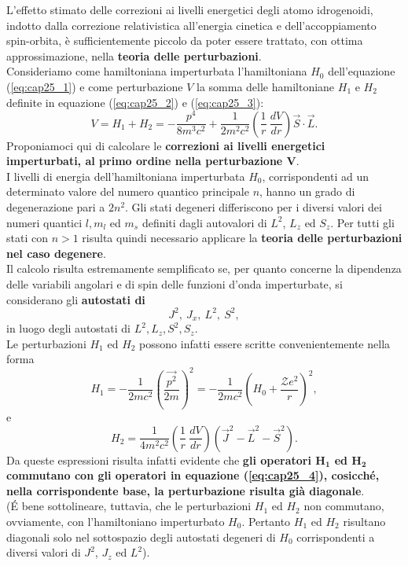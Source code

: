 L'effetto stimato delle correzioni ai livelli energetici degli atomo idrogenoidi, indotto dalla correzione relativistica all'energia cinetica e dell'accoppiamento spin-orbita, è sufficientemente piccolo da poter essere trattato, con ottima approssimazione, nella \textbf{teoria delle perturbazioni}. \\
Consideriamo come hamiltoniana imperturbata l'hamiltoniana $H_0$ dell'equazione (\ref{eq:cap25_1}) e come perturbazione $V$ la somma delle hamiltoniane $H_1$ e $H_2$ definite in equazione (\ref{eq:cap25_2}) e (\ref{eq:cap25_3}):
\begin{equation} 
V=H_1+H_2=-\frac{p^4}{8m^3c^2}+\frac{1}{2m^2c^2} \left( \frac{1}{r} \ \frac{dV}{dr} \right) \vec{S} \cdot \vec{L} .
\end{equation}
Proponiamoci qui di calcolare le \textbf{correzioni ai livelli energetici imperturbati, al primo ordine nella perturbazione $\boldsymbol{V}$}. \\
I livelli di energia dell'hamiltoniana imperturbata $H_0$, corrispondenti ad un determinato valore del numero quantico principale $n$, hanno un grado di degenerazione pari a $2n^2$. Gli stati degeneri differiscono per i diversi valori dei numeri quantici $l,m_l$ ed $m_s$ definiti dagli autovalori di $L^2$, $L_z$ ed $S_z$. Per tutti gli stati con $n>1$ risulta quindi necessario applicare la \textbf{teoria delle perturbazioni nel caso degenere}. \\
Il calcolo risulta estremamente semplificato se, per quanto concerne la dipendenza delle variabili angolari e di spin delle funzioni d'onda imperturbate, si considerano gli \textbf{autostati di}
\begin{equation} \label{eq:cap25_4}
J^2, \ J_x, \ L^2, \ S^2 ,
\end{equation}
in luogo degli autostati di $L^2, L_z, S^2, S_z$. \\
Le perturbazioni $H_1$ ed $H_2$ possono infatti essere scritte convenientemente nella forma
\begin{equation} \label{eq:cap25_5}
H_1=-\frac{1}{2mc^2} \left( \frac{\vec{p^2}}{2m} \right)^2 = -\frac{1}{2mc^2} \left( H_0+\frac{\mathcal{Z}e^2}{r} \right)^2 ,
\end{equation}
e
\begin{equation} \label{eq:cap25_6}
H_2=\frac{1}{4m^2c^2} \left( \frac{1}{r} \ \frac{dV}{dr} \right) \left(\vec{J}^2-\vec{L}^2-\vec{S}^2 \right) .
\end{equation}
Da queste espressioni risulta infatti evidente che \textbf{gli operatori $\boldsymbol{H_1}$ ed $\boldsymbol{H_2}$ commutano con gli operatori in equazione (\ref{eq:cap25_4}), cosicché, nella corrispondente base, la perturbazione risulta già diagonale}. \\ (\'E bene sottolineare, tuttavia, che le perturbazioni $H_1$ ed $H_2$ non commutano, ovviamente, con l'hamiltoniano imperturbato $H_0$. Pertanto $H_1$ ed $H_2$ risultano diagonali solo nel sottospazio degli autostati degeneri di $H_0$ corrispondenti a diversi valori di $J^2$, $J_z$ ed $L^2$). \\
